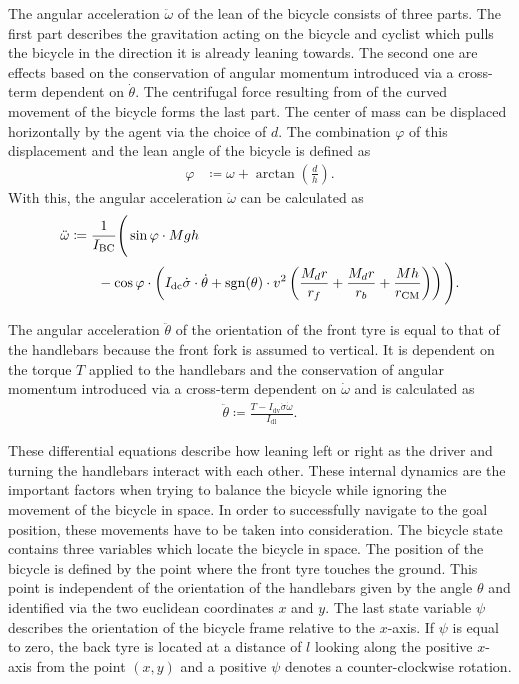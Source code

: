 The angular acceleration $\ddot{\omega}$ of the lean of the bicycle consists of three parts.
The first part describes the gravitation acting on the bicycle and cyclist which pulls the bicycle in the direction it is already leaning towards.
The second one are effects based on the conservation of angular momentum introduced via a cross-term dependent on $\dot{\theta}$.
The centrifugal force resulting from of the curved movement of the bicycle forms the last part.
The center of mass can be displaced horizontally by the agent via the choice of $d$.
The combination $\varphi$ of this displacement and the lean angle of the bicycle is defined as
\begin{align}
    \varphi &\coloneqq \omega + \arctan \left( \frac{d}{h} \right).
\end{align}
With this, the angular acceleration $\ddot{\omega}$ can be calculated as
\begin{align}
    \label{eq:omega_dotdot}
    \begin{split}
        \ddot{\omega} &\coloneqq \frac{1}{I_{\text{BC}}} \Bigg(
            \sin \varphi \cdot Mgh \\
            &\qquad- \cos \varphi \cdot \left(
                I_{\text{dc}}\dot{\sigma}\cdot\dot{\theta} +
                \operatorname{sgn}(\theta) \cdot v^2 \left(
                    \frac{M_dr}{r_f} + \frac{M_d r}{r_b} + \frac{Mh}{r_{\text{CM}}}
                \right)
            \right)
        \Bigg).
    \end{split}
\end{align}

The angular acceleration $\ddot{\theta}$ of the orientation of the front tyre is equal to that of the handlebars because the front fork is assumed to vertical.
It is dependent on the torque $T$ applied to the handlebars and the conservation of angular momentum introduced via a cross-term dependent on $\dot{\omega}$ and is calculated as
\begin{align}
    \label{eq:theta_dotdot}
    \ddot{\theta} \coloneqq \frac{T - I_{\text{dv}}\dot{\sigma}\dot{\omega}}{I_{\text{dl}}}.
\end{align}

These differential equations describe how leaning left or right as the driver and turning the handlebars interact with each other.
These internal dynamics are the important factors when trying to balance the bicycle while ignoring the movement of the bicycle in space.
In order to successfully navigate to the goal position, these movements have to be taken into consideration.
The bicycle state contains three variables which locate the bicycle in space.
The position of the bicycle is defined by the point where the front tyre touches the ground.
This point is independent of the orientation of the handlebars given by the angle $\theta$ and identified via the two euclidean coordinates $x$ and $y$.
The last state variable $\psi$ describes the orientation of the bicycle frame relative to the $x$-axis.
If $\psi$ is equal to zero, the back tyre is located at a distance of $l$ looking along the positive $x$-axis from the point $(x, y)$ and a positive $\psi$ denotes a counter-clockwise rotation.

